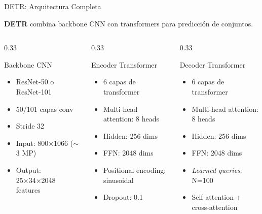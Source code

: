 \documentclass[aspectratio=169, 10pt]{beamer}
\begin{document}
\begin{frame}[shrink]{DETR: Arquitectura Completa}

	\textbf{DETR} combina backbone CNN con transformers para predicci\'on de conjuntos.

	\vspace{0.15cm}

	\begin{columns}[T]
		\begin{column}{0.33\textwidth}
			\begin{block}{Backbone CNN}
				\small
				\begin{itemize}
					\item ResNet-50 o ResNet-101
					\item 50/101 capas conv
					\item Stride 32
					\item Input: 800×1066 ($\sim$3 MP)
					\item Output: 25×34×2048 features
				\end{itemize}
			\end{block}
		\end{column}

		\begin{column}{0.33\textwidth}
			\begin{block}{Encoder Transformer}
				\small
				\begin{itemize}
					\item 6 capas de transformer
					\item Multi-head attention: 8 heads
					\item Hidden: 256 dims
					\item FFN: 2048 dims
					\item Positional encoding: sinusoidal
					\item Dropout: 0.1
				\end{itemize}
			\end{block}
		\end{column}

		\begin{column}{0.33\textwidth}
			\begin{block}{Decoder Transformer}
				\small
				\begin{itemize}
					\item 6 capas de transformer
					\item Multi-head attention: 8 heads
					\item Hidden: 256 dims
					\item FFN: 2048 dims
					\item \textit{Learned queries}: N=100
					\item Self-attention + cross-attention
				\end{itemize}
			\end{block}
		\end{column}
	\end{columns}

\end{frame}
\end{document}
